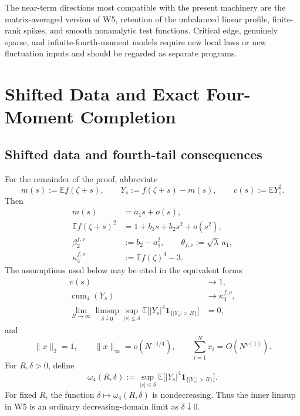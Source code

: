 \documentclass[10pt,a4paper]{amsart}
\newcommand{\E}{\mathbb E}
\newcommand{\cum}{\operatorname{cum}}
\newcommand{\one}{\mathbf 1}
\newcommand{\norm}[1]{\lVert #1\rVert}
\begin{document}
The near-term directions most compatible with the present machinery are the
matrix-averaged version of W5, retention of the unbalanced linear profile,
finite-rank spikes, and smooth nonanalytic test functions.  Critical edge,
genuinely sparse, and infinite-fourth-moment models require new local laws or
new fluctuation inputs and should be regarded as separate programs.

\appendix

\section{Shifted Data and Exact Four-Moment Completion}
\label{app:proof-notation}
\subsection{Shifted data and fourth-tail consequences}
\label{sec:R1-package}
For the remainder of the proof, abbreviate
\begin{equation}\label{eq:shifted-data-package}
 m(s):=\E f(\zeta+s),\qquad
 Y_s:=f(\zeta+s)-m(s),\qquad
 v(s):=\E Y_s^2.
\end{equation}
Then
\begin{align}
 m(s)&=a_1s+o(s),\label{eq:mean-profile-package}\\
 \E f(\zeta+s)^2&=1+b_1s+b_2s^2+o(s^2),
 \label{eq:second-profile-package}\\
 \beta_2^{f,\nu}&:=b_2-a_1^2,\qquad
 \theta_{f,\nu}:=\sqrt\lambda\,a_1,\label{eq:beta-package}\\
 \kappa_4^{f,\nu}&:=\E f(\zeta)^4-3.\label{eq:kappa-package}
\end{align}
The assumptions used below may be cited in the equivalent forms
\begin{align}
 v(s)&\longrightarrow1,\label{eq:W3-package}\\
 \cum_4(Y_s)&\longrightarrow\kappa_4^{f,\nu},\label{eq:W4-package}\\
 \lim_{R\to\infty}\limsup_{\delta\downarrow0}
 \sup_{|s|\le\delta}
 \E\bigl[|Y_s|^4\one_{\{|Y_s|>R\}}\bigr]&=0,
 \label{eq:W5-package}
\end{align}
and
\begin{equation}\label{eq:spike-package}
 \norm{x}_2=1,\qquad
 \norm{x}_\infty=o(N^{-1/4}),\qquad
 \sum_{i=1}^N x_i=O(N^{o(1)}).
\end{equation}
For \(R,\delta>0\), define
\begin{equation}\label{eq:tail-modulus-package}
 \omega_4(R,\delta)
 :=\sup_{|s|\le\delta}
 \E\bigl[|Y_s|^4\one_{\{|Y_s|>R\}}\bigr].
\end{equation}
For fixed \(R\), the function \(\delta\mapsto\omega_4(R,\delta)\) is
nondecreasing.  Thus the inner limsup in W5 is an ordinary decreasing-domain
limit as \(\delta\downarrow0\).
\end{document}
